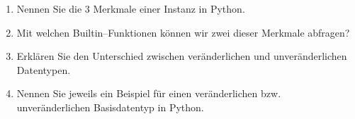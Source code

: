 \begin{enumerate}
	\item Nennen Sie die 3 Merkmale einer Instanz in Python.
	\item Mit welchen Builtin--Funktionen können wir zwei dieser Merkmale abfragen?
	\item Erklären Sie den Unterschied zwischen veränderlichen und unveränderlichen Datentypen.
	\item Nennen Sie jeweils ein Beispiel für einen veränderlichen bzw. unveränderlichen Basisdatentyp in Python.
\end{enumerate}